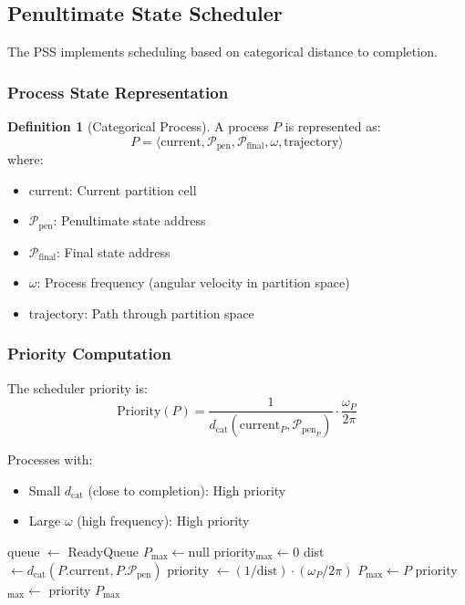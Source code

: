 \documentclass[twocolumn,10pt]{article}
\theoremstyle{definition}
\newtheorem{definition}[theorem]{Definition}
\theoremstyle{remark}
\newcommand{\pentstate}{\mathcal{P}_{\text{pen}}}
\newcommand{\finalstate}{\mathcal{P}_{\text{final}}}
\newcommand{\dcat}{d_{\text{cat}}}
\begin{document}
\subsection{Penultimate State Scheduler}

The PSS implements scheduling based on categorical distance to completion.

\subsubsection{Process State Representation}

\begin{definition}[Categorical Process]
A process $P$ is represented as:
\begin{equation}
    P = \langle \text{current}, \pentstate, \finalstate, \omega, \text{trajectory} \rangle
\end{equation}
where:
\begin{itemize}
    \item current: Current partition cell
    \item $\pentstate$: Penultimate state address
    \item $\finalstate$: Final state address
    \item $\omega$: Process frequency (angular velocity in partition space)
    \item trajectory: Path through partition space
\end{itemize}
\end{definition}

\subsubsection{Priority Computation}

The scheduler priority is:
\begin{equation}
    \text{Priority}(P) = \frac{1}{\dcat(\text{current}_P, \pentstate_P)} \cdot \frac{\omega_P}{2\pi}
\end{equation}

Processes with:
\begin{itemize}
    \item Small $\dcat$ (close to completion): High priority
    \item Large $\omega$ (high frequency): High priority
\end{itemize}

\begin{algorithm}
\caption{Penultimate State Scheduling}
\begin{algorithmic}[1]
    \State queue $\gets$ ReadyQueue
    \State $P_{\max} \gets \text{null}$
    \State priority$_{\max} \gets 0$
        \State dist $\gets \dcat(P.\text{current}, P.\pentstate)$
        \State priority $\gets (1/\text{dist}) \cdot (\omega_P / 2\pi)$
            \State $P_{\max} \gets P$
            \State priority$_{\max} \gets$ priority
        \EndIf
    \EndFor
    \State \Return $P_{\max}$
\EndFunction
\end{algorithmic}
\end{algorithm}
\end{document}
